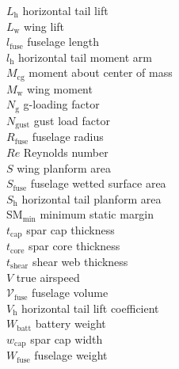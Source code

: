 \documentclass[]{aiaa-tc}%
\begin{document}
\begin{multicols}{2}
\begin{tabbing}
$L_\text{h}$ \> horizontal tail lift \\ %
$L_\text{w}$ \> wing lift \\ %
$l_\text{fuse}$ \> fuselage length \\ %
$l_\text{h}$ \> horizontal tail moment arm \\ %
$M_{\mathrm{cg}}$ \> moment about center of mass \\
$M_{\mathrm{w}}$ \> wing moment \\
$N_{\text{g}}$ \> g-loading factor\\
$N_{\text{gust}}$ \> gust load factor\\
$R_{\text{fuse}}$ \> fuselage radius \\ %
$Re$ \> Reynolds number \\
$S$ \> wing planform area \\ %
$S_{\text{fuse}}$ \> fuselage wetted surface area \\ %
$S_{\text{h}}$ \> horizontal tail planform area \\ %
SM$_{\mathrm{min}}$ \> minimum static margin \\
$t_{\text{cap}}$ \> spar cap thickness \\ %
$t_{\text{core}}$ \> spar core thickness \\ %
$t_{\text{shear}}$ \> shear web thickness \\
$V$ \> true airspeed \\ %
$\mathcal{V}_{\text{fuse}}$ \>  fuselage volume \\ %
$V_{\text{h}}$ \> horizontal tail lift coefficient \\
$W_{\text{batt}}$ \> battery weight \\ %
$w_{\text{cap}}$ \> spar cap width \\ %
$W_{\text{fuse}}$ \> fuselage weight \\ %

\end{tabbing}
\end{multicols}
\end{document}

